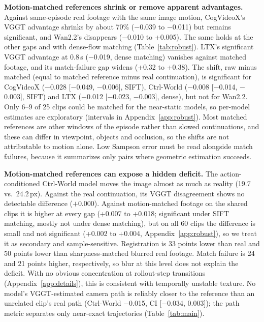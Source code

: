 \documentclass{article}
\begin{document}
\textbf{Motion-matched references shrink or remove apparent advantages.} Against same-episode real
footage with the same image motion, CogVideoX's VGGT advantage shrinks by about 70\% ($-$0.039 to
$-$0.011) but remains significant, and Wan2.2's disappears ($-$0.010 to +0.005). The same holds at the
other gaps and with dense-flow matching (Table~\ref{tab:robust}). LTX's significant VGGT advantage at
0.8\,s ($-$0.019, dense matching) vanishes against matched footage, and its match-failure gap widens
(+0.32 to +0.38). The shift, raw minus matched (equal to matched reference minus real
continuation), is significant for CogVideoX ($-$0.028 [$-$0.049, $-$0.006], SIFT), Ctrl-World ($-$0.008 [$-$0.014,
$-$0.003], SIFT) and LTX ($-$0.012 [$-$0.023, $-$0.003], dense), but not for Wan2.2. Only 6--9 of 25
clips could be matched for the near-static models, so per-model estimates are exploratory
(intervals in Appendix~\ref{app:robust}). Most matched references are other windows of the episode
rather than slowed continuations, and these can differ in viewpoint, objects and occlusion, so the
shifts are not attributable to motion alone. Low Sampson error must be read alongside match
failures, because it summarizes only pairs where geometric estimation succeeds.

\textbf{Motion-matched references can expose a hidden deficit.} The action-conditioned Ctrl-World
model moves the image almost as much as reality (19.7 vs.\ 24.2\,px). Against the real continuation,
its VGGT disagreement shows no detectable difference ($+$0.000). Against motion-matched footage on the
shared clips it is higher at every gap (+0.007 to +0.018; significant under SIFT matching, mostly not
under dense matching), but on all 60 clips the difference is small and not significant (+0.002 to
+0.004, Appendix~\ref{app:robust}), so we treat it as secondary and sample-sensitive.
Registration is 33 points lower than real
and 50 points lower than sharpness-matched blurred real footage. Match failure is 24 and 21 points
higher, respectively, so blur at this level does not explain the deficit. With no obvious
concentration at rollout-step transitions (Appendix~\ref{app:details}), this is consistent with
temporally unstable texture. No model's VGGT-estimated camera path is reliably closer to the reference than an
unrelated clip's real path (Ctrl-World $-$0.015, CI [$-$0.034, 0.003]); the path metric
separates only near-exact trajectories (Table~\ref{tab:main}).
\end{document}
